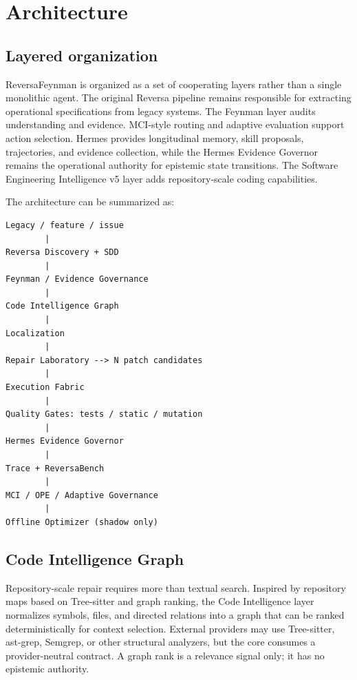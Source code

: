 \section{Architecture}

\subsection{Layered organization}

ReversaFeynman is organized as a set of cooperating layers rather than a single monolithic agent. The original Reversa pipeline remains responsible for extracting operational specifications from legacy systems. The Feynman layer audits understanding and evidence. MCI-style routing and adaptive evaluation support action selection. Hermes provides longitudinal memory, skill proposals, trajectories, and evidence collection, while the Hermes Evidence Governor remains the operational authority for epistemic state transitions. The Software Engineering Intelligence v5 layer adds repository-scale coding capabilities.

The architecture can be summarized as:

\begin{center}
\begin{minipage}{0.88\linewidth}
\begin{verbatim}
Legacy / feature / issue
        |
Reversa Discovery + SDD
        |
Feynman / Evidence Governance
        |
Code Intelligence Graph
        |
Localization
        |
Repair Laboratory --> N patch candidates
        |
Execution Fabric
        |
Quality Gates: tests / static / mutation
        |
Hermes Evidence Governor
        |
Trace + ReversaBench
        |
MCI / OPE / Adaptive Governance
        |
Offline Optimizer (shadow only)
\end{verbatim}
\end{minipage}
\end{center}

\subsection{Code Intelligence Graph}

Repository-scale repair requires more than textual search. Inspired by repository maps based on Tree-sitter and graph ranking, the Code Intelligence layer normalizes symbols, files, and directed relations into a graph that can be ranked deterministically for context selection. External providers may use Tree-sitter, ast-grep, Semgrep, or other structural analyzers, but the core consumes a provider-neutral contract. A graph rank is a relevance signal only; it has no epistemic authority.

